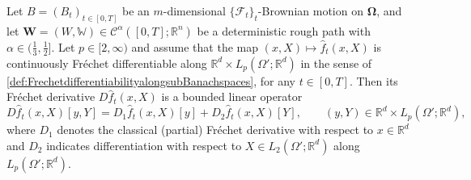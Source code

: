 \documentclass[10pt, a4paper]{article} %
\newcommand{\R}{\mathbb{R}}
\theoremstyle{definition}
\theoremstyle{plain}
\begin{document}
Let $B=(B_t)_{t \in [0,T]}$ be an $m$-dimensional $\{\mathcal{F}_t\}_t$-Brownian motion on $\mathbf{\Omega}$, and let $\mathbf{W}=(W,\mathbb{W}) \in \mathscr{C}^\alpha([0,T];\R^n)$ be a deterministic rough path with $\alpha \in (\frac{1}{3},\frac{1}{2}]$. 
{Let $p \in [2,\infty)$ and assume that the map $(x,X) \mapsto \hat f_t(x,X)$ is continuously Fréchet differentiable along $\R^d \times L_p(\Omega';\R^d)$ in the sense of \cref{def:FrechetdifferentiabilityalongsubBanachspaces}, for any $t \in [0,T]$.  
Then its Fréchet derivative $D \hat f_t(x,X)$ is a bounded linear operator 
\begin{equation*}
    D \hat f_t(x,X)[y,Y] = D_1 \hat f_t(x,X)[y] + D_2 \hat f_t(x,X)[Y], \qquad (y,Y) \in \R^d \times L_p(\Omega';\R^d), 
\end{equation*}
where $D_1$ denotes the classical (partial) Fréchet derivative with respect to $x \in \R^d$ and $D_2$ indicates differentiation with respect to $X \in L_2(\Omega';\R^d)$ along $L_p(\Omega';\R^d)$. 
}
\end{document}

